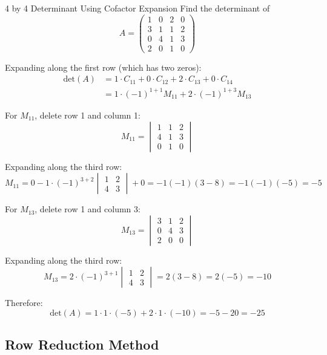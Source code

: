 \documentclass[12pt,a4paper]{article}
\newcommand{\Det}{\text{det}}
\begin{document}
	\begin{example}{4 by 4 Determinant Using Cofactor Expansion}
		Find the determinant of 
		\[
		A = \begin{pmatrix} 
			1 & 0 & 2 & 0 \\
			3 & 1 & 1 & 2 \\
			0 & 4 & 1 & 3 \\
			2 & 0 & 1 & 0
		\end{pmatrix}
		\]
		
		Expanding along the first row (which has two zeros):
		\begin{align*}
			\Det(A) &= 1 \cdot C_{11} + 0 \cdot C_{12} + 2 \cdot C_{13} + 0 \cdot C_{14} \\
			&= 1 \cdot (-1)^{1+1} M_{11} + 2 \cdot (-1)^{1+3} M_{13}
		\end{align*}
		
		For $M_{11}$, delete row 1 and column 1:
		\[
		M_{11} = \begin{vmatrix} 
			1 & 1 & 2 \\
			4 & 1 & 3 \\
			0 & 1 & 0
		\end{vmatrix}
		\]
		
		Expanding along the third row:
		\[
		M_{11} = 0 - 1 \cdot (-1)^{3+2} \begin{vmatrix} 1 & 2 \\ 4 & 3 \end{vmatrix} + 0 = -1(-1)(3 - 8) = -1(-1)(-5) = -5
		\]
		
		For $M_{13}$, delete row 1 and column 3:
		\[
		M_{13} = \begin{vmatrix} 
			3 & 1 & 2 \\
			0 & 4 & 3 \\
			2 & 0 & 0
		\end{vmatrix}
		\]
		
		Expanding along the third row:
		\[
		M_{13} = 2 \cdot (-1)^{3+1} \begin{vmatrix} 1 & 2 \\ 4 & 3 \end{vmatrix} = 2(3 - 8) = 2(-5) = -10
		\]
		
		Therefore:
		\[
		\Det(A) = 1 \cdot 1 \cdot (-5) + 2 \cdot 1 \cdot (-10) = -5 - 20 = -25
		\]
	\end{example}
	
	\subsection{Row Reduction Method}
	
\end{document}
